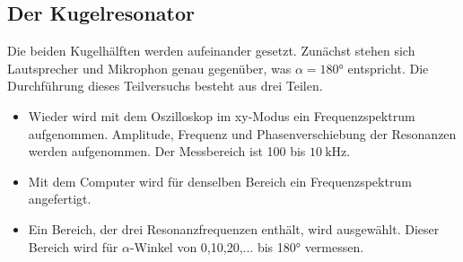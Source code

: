 \subsection{Der Kugelresonator}
Die beiden Kugelhälften werden aufeinander gesetzt. Zunächst stehen sich Lautsprecher und Mikrophon genau gegenüber, was $\alpha=180°$ entspricht. Die Durchführung dieses Teilversuchs besteht aus drei Teilen.
\begin{itemize}
  \item Wieder wird mit dem Oszilloskop im xy-Modus ein Frequenzspektrum aufgenommen. Amplitude, Frequenz und Phasenverschiebung der Resonanzen werden aufgenommen. Der Messbereich ist 100 bis $\SI{10}{\kilo\hertz}$.
  \item Mit dem Computer wird für denselben Bereich ein Frequenzspektrum angefertigt.
  \item Ein Bereich, der drei Resonanzfrequenzen enthält, wird ausgewählt. Dieser Bereich wird für $\alpha$-Winkel von 0,10,20,... bis 180° vermessen.
\end{itemize}
